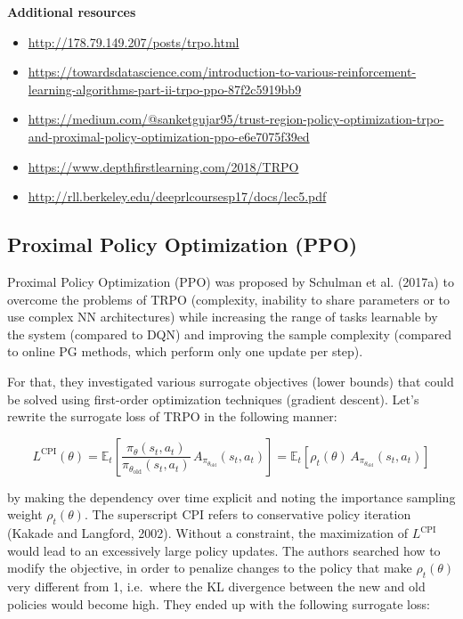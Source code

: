 \documentclass[
  letterpaper,
  DIV=11,
  numbers=noendperiod]{scrreprt}
\providecommand{\tightlist}{%
  \setlength{\itemsep}{0pt}\setlength{\parskip}{0pt}}\usepackage{longtable,booktabs,array}
\begin{document}
\textbf{Additional resources}

\begin{itemize}
\tightlist
\item
  \url{http://178.79.149.207/posts/trpo.html}
\item
  \url{https://towardsdatascience.com/introduction-to-various-reinforcement-learning-algorithms-part-ii-trpo-ppo-87f2c5919bb9}
\item
  \url{https://medium.com/@sanketgujar95/trust-region-policy-optimization-trpo-and-proximal-policy-optimization-ppo-e6e7075f39ed}
\item
  \url{https://www.depthfirstlearning.com/2018/TRPO}
\item
  \url{http://rll.berkeley.edu/deeprlcoursesp17/docs/lec5.pdf}
\end{itemize}

\hypertarget{proximal-policy-optimization-ppo}{%
\subsection{Proximal Policy Optimization
(PPO)}\label{proximal-policy-optimization-ppo}}

Proximal Policy Optimization (PPO) was proposed by Schulman et al.
(2017a) to overcome the problems of TRPO (complexity, inability to share
parameters or to use complex NN architectures) while increasing the
range of tasks learnable by the system (compared to DQN) and improving
the sample complexity (compared to online PG methods, which perform only
one update per step).

For that, they investigated various surrogate objectives (lower bounds)
that could be solved using first-order optimization techniques (gradient
descent). Let's rewrite the surrogate loss of TRPO in the following
manner:

\[
    L^\text{CPI}(\theta) = \mathbb{E}_{t} [\frac{\pi_\theta(s_t, a_t)}{\pi_{\theta_\text{old}}(s_t, a_t)} \, A_{\pi_{\theta_\text{old}}}(s_t, a_t)] = \mathbb{E}_{t} [\rho_t(\theta) \, A_{\pi_{\theta_\text{old}}}(s_t, a_t)]
\]

by making the dependency over time explicit and noting the importance
sampling weight \(\rho_t(\theta)\). The superscript CPI refers to
conservative policy iteration (Kakade and Langford, 2002). Without a
constraint, the maximization of \(L^\text{CPI}\) would lead to an
excessively large policy updates. The authors searched how to modify the
objective, in order to penalize changes to the policy that make
\(\rho_t(\theta)\) very different from 1, i.e.~where the KL divergence
between the new and old policies would become high. They ended up with
the following surrogate loss:
\end{document}
